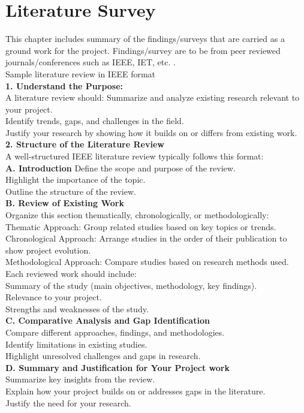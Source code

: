 \chapter{Literature Survey}

This chapter includes summary of the findings/surveys that are carried as a ground work for the project. Findings/survey are to be from peer reviewed journals/conferences such as IEEE, IET, etc. .
\\ Sample  literature review in IEEE format \\
\textbf{1. Understand the Purpose:}\\
A literature review should:
Summarize and analyze existing research relevant to your project.\\
Identify trends, gaps, and challenges in the field.\\
Justify your research by showing how it builds on or differs from existing work.\\
\textbf{2. Structure of the Literature Review} \\
A well-structured IEEE literature review typically follows this format:\\
\textbf{A. Introduction}
Define the scope and purpose of the review.\\
Highlight the importance of the topic.\\
Outline the structure of the review.\\
\textbf{B. Review of Existing Work}\\
Organize this section thematically, chronologically, or methodologically: \\
Thematic Approach: Group related studies based on key topics or trends.\\
Chronological Approach: Arrange studies in the order of their publication to show project evolution.\\
Methodological Approach: Compare studies based on research methods used.
Each reviewed work should include:\\
Summary of the study (main objectives, methodology, key findings).\\
Relevance to your project.\\
Strengths and weaknesses of the study.\\
\textbf{C. Comparative Analysis and  Gap Identification}\\
Compare different approaches, findings, and methodologies.\\
Identify limitations in existing studies.\\
Highlight unresolved challenges and gaps in research.\\
\textbf{D. Summary and Justification for Your Project work}\\
Summarize key insights from the review.\\
Explain how your project builds on or addresses gaps in the literature.\\
Justify the need for your research.\\

